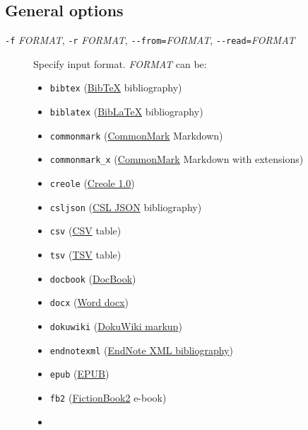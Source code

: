 \documentclass[
]{article}
\providecommand{\tightlist}{%
  \setlength{\itemsep}{0pt}\setlength{\parskip}{0pt}}
\begin{document}
\subsection{General options}\label{general-options}

\begin{description}
\item[\texttt{-f} \emph{FORMAT}, \texttt{-r} \emph{FORMAT},
\texttt{-\/-from=}\emph{FORMAT}, \texttt{-\/-read=}\emph{FORMAT}]
Specify input format. \emph{FORMAT} can be:

\label{input-formats}
\begin{itemize}
\tightlist
\item
  \texttt{bibtex} (\href{https://ctan.org/pkg/bibtex}{BibTeX}
  bibliography)
\item
  \texttt{biblatex} (\href{https://ctan.org/pkg/biblatex}{BibLaTeX}
  bibliography)
\item
  \texttt{commonmark} (\href{https://commonmark.org}{CommonMark}
  Markdown)
\item
  \texttt{commonmark\_x} (\href{https://commonmark.org}{CommonMark}
  Markdown with extensions)
\item
  \texttt{creole}
  (\href{http://www.wikicreole.org/wiki/Creole1.0}{Creole 1.0})
\item
  \texttt{csljson}
  (\href{https://citeproc-js.readthedocs.io/en/latest/csl-json/markup.html}{CSL
  JSON} bibliography)
\item
  \texttt{csv} (\href{https://tools.ietf.org/html/rfc4180}{CSV} table)
\item
  \texttt{tsv}
  (\href{https://www.iana.org/assignments/media-types/text/tab-separated-values}{TSV}
  table)
\item
  \texttt{docbook} (\href{https://docbook.org}{DocBook})
\item
  \texttt{docx}
  (\href{https://en.wikipedia.org/wiki/Office_Open_XML}{Word docx})
\item
  \texttt{dokuwiki} (\href{https://www.dokuwiki.org/dokuwiki}{DokuWiki
  markup})
\item
  \texttt{endnotexml}
  (\href{https://support.clarivate.com/Endnote/s/article/EndNote-XML-Document-Type-Definition}{EndNote
  XML bibliography})
\item
  \texttt{epub} (\href{http://idpf.org/epub}{EPUB})
\item
  \texttt{fb2}
  (\href{http://www.fictionbook.org/index.php/Eng:XML_Schema_Fictionbook_2.1}{FictionBook2}
  e-book)
\item

\end{itemize}
\end{description}
\end{document}
